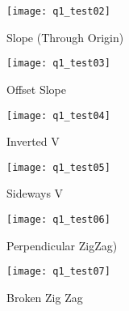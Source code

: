			\begin{figure}[position = here]
				\begin{centering}
					\texttt{[image: q1\_test02]}\\
					\caption[\textit{RPYAxes}]{Slope (Through Origin)}
				\end{centering}
			\end{figure}
			\newline
			
			\begin{figure}[position = here]
				\begin{centering}
					\texttt{[image: q1\_test03]}\\
					\caption[\textit{RPYAxes}]{Offset Slope}
				\end{centering}
			\end{figure}
			\newline
			
			\begin{figure}[position = here]
				\begin{centering}
					\texttt{[image: q1\_test04]}\\
					\caption[\textit{RPYAxes}]{Inverted V}
				\end{centering}
			\end{figure}
			\newline			
			
			\begin{figure}[position = here]
				\begin{centering}
					\texttt{[image: q1\_test05]}\\
					\caption[\textit{RPYAxes}]{Sideways V}
				\end{centering}
			\end{figure}
			\newline			
			
			\begin{figure}[position = here]
				\begin{centering}
					\texttt{[image: q1\_test06]}\\
					\caption[\textit{RPYAxes}]{Perpendicular ZigZag)}
				\end{centering}
			\end{figure}
			\newline			
			
			\begin{figure}[position = here]
				\begin{centering}
					\texttt{[image: q1\_test07]}\\
					\caption[\textit{RPYAxes}]{Broken Zig Zag}
				\end{centering}
			\end{figure}
			\newline			
			
